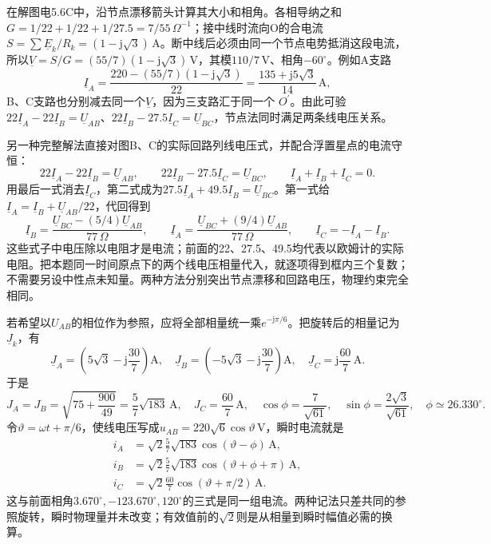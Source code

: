 \documentclass[UTF8,fontset=fandol,a4paper,11pt]{ctexart}
\begin{document}
在解图电5.6C中，沿节点漂移箭头计算其大小和相角。各相导纳之和$G=1/22+1/22+1/27.5=7/55\,\Omega^{-1}$；接中线时流向O的合电流$S=\sum\underline E_k/R_k=(1-\mathrm j\sqrt3)\,\mathrm A$。断中线后必须由同一个节点电势抵消这段电流，所以$\underline V=S/G=(55/7)(1-\mathrm j\sqrt3)\,\mathrm V$，其模$110/7\,\mathrm V$、相角$-60^\circ$。例如A支路
\[
\underline I_A=\frac{220-(55/7)(1-\mathrm j\sqrt3)}{22}
=\frac{135+\mathrm j5\sqrt3}{14}\,\mathrm A,
\]
B、C支路也分别减去同一个$\underline V$，因为三支路汇于同一个 $O^{\prime}$。由此可验$22\underline I_A-22\underline I_B=\underline U_{AB}$、$22\underline I_B-27.5\underline I_C=\underline U_{BC}$，节点法同时满足两条线电压关系。

另一种完整解法直接对图B、C的实际回路列线电压式，并配合浮置星点的电流守恒：
\[
22\underline I_A-22\underline I_B=\underline U_{AB},\qquad
22\underline I_B-27.5\underline I_C=\underline U_{BC},\qquad
\underline I_A+\underline I_B+\underline I_C=0.
\]
用最后一式消去$\underline I_C$，第二式成为$27.5\underline I_A+49.5\underline I_B=\underline U_{BC}$。第一式给$\underline I_A=\underline I_B+\underline U_{AB}/22$，代回得到
\[
\underline I_B=\frac{\underline U_{BC}-(5/4)\underline U_{AB}}{77\,\Omega},\qquad
\underline I_A=\frac{\underline U_{BC}+(9/4)\underline U_{AB}}{77\,\Omega},\qquad
\underline I_C=-\underline I_A-\underline I_B.
\]
这些式子中电压除以电阻才是电流；前面的22、27.5、49.5均代表以欧姆计的实际电阻。把本题同一时间原点下的两个线电压相量代入，就逐项得到框内三个复数；不需要另设中性点未知量。两种方法分别突出节点漂移和回路电压，物理约束完全相同。

若希望以$U_{AB}$的相位作为参照，应将全部相量统一乘$e^{-\mathrm j\pi/6}$。把旋转后的相量记为$\underline J_k$，有
\[
\underline J_A=\left(5\sqrt3-\mathrm j\frac{30}{7}\right)\mathrm A,\quad
\underline J_B=\left(-5\sqrt3-\mathrm j\frac{30}{7}\right)\mathrm A,\quad
\underline J_C=\mathrm j\frac{60}{7}\,\mathrm A.
\]
于是
\[
J_A=J_B=\sqrt{75+\frac{900}{49}}=\frac5{7}\sqrt{183}\,\mathrm A,
\quad J_C=\frac{60}{7}\,\mathrm A,
\quad \cos\phi=\frac7{\sqrt{61}},\quad
\sin\phi=\frac{2\sqrt3}{\sqrt{61}},\quad \phi\simeq26.330^\circ.
\]
令$\vartheta=\omega t+\pi/6$，使线电压写成$u_{AB}=220\sqrt6\cos\vartheta\,\mathrm V$，瞬时电流就是
\[
\begin{aligned}
i_A&=\sqrt2\frac5{7}\sqrt{183}\cos(\vartheta-\phi)\,\mathrm A,\\
i_B&=\sqrt2\frac5{7}\sqrt{183}\cos(\vartheta+\phi+\pi)\,\mathrm A,\\
i_C&=\sqrt2\frac{60}{7}\cos(\vartheta+\pi/2)\,\mathrm A.
\end{aligned}
\]
这与前面相角$3.670^\circ,-123.670^\circ,120^\circ$的三式是同一组电流。两种记法只差共同的参照旋转，瞬时物理量并未改变；有效值前的$\sqrt2$则是从相量到瞬时幅值必需的换算。
\end{document}

